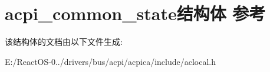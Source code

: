 \hypertarget{structacpi__common__state}{}\section{acpi\+\_\+common\+\_\+state结构体 参考}
\label{structacpi__common__state}


该结构体的文档由以下文件生成\+:\begin{DoxyCompactItemize}
\item 
E\+:/\+React\+O\+S-\/0../drivers/bus/acpi/acpica/include/aclocal.\+h\end{DoxyCompactItemize}
